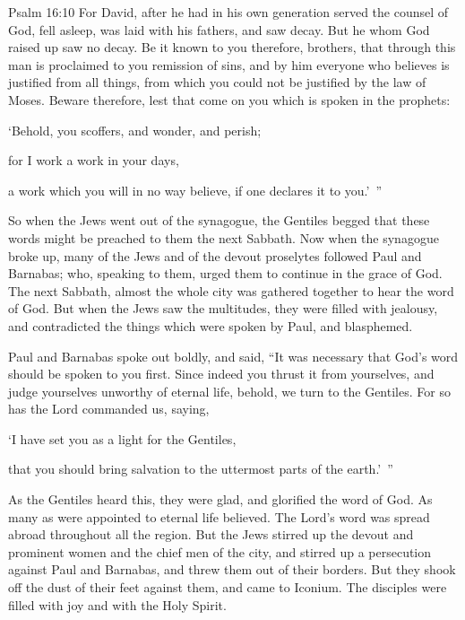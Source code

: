 {{Psalm 16:10}
For David, after he had in his own generation served the counsel of God, fell asleep, was laid with his fathers, and saw decay.
But he whom God raised up saw no decay.
Be it known to you therefore, brothers, that through this man is proclaimed to you remission of sins,
and by him everyone who believes is justified from all things, from which you could not be justified by the law of Moses.
Beware therefore, lest that come on you which is spoken in the prophets:
\par }{\Q {}‘Behold, you scoffers, and wonder, and perish;
\par }{\QB for I work a work in your days,
\par }{\QB a work which you will in no way believe, if one declares it to you.’ ”
\par }{\PP {}So when the Jews went out of the synagogue, the Gentiles begged that these words might be preached to them the next Sabbath.
Now when the synagogue broke up, many of the Jews and of the devout proselytes followed Paul and Barnabas; who, speaking to them, urged them to continue in the grace of God.
The next Sabbath, almost the whole city was gathered together to hear the word of God.
But when the Jews saw the multitudes, they were filled with jealousy, and contradicted the things which were spoken by Paul, and blasphemed.
\par }{\PP {}Paul and Barnabas spoke out boldly, and said, “It was necessary that God’s word should be spoken to you first. Since indeed you thrust it from yourselves, and judge yourselves unworthy of eternal life, behold, we turn to the Gentiles.
For so has the Lord commanded us, saying,
\par }{\Q ‘I have set you as a light for the Gentiles,
\par }{\QB that you should bring salvation to the uttermost parts of the earth.’ ”
\par }{\PP {}As the Gentiles heard this, they were glad, and glorified the word of God. As many as were appointed to eternal life believed.
The Lord’s word was spread abroad throughout all the region.
But the Jews stirred up the devout and prominent women and the chief men of the city, and stirred up a persecution against Paul and Barnabas, and threw them out of their borders.
But they shook off the dust of their feet against them, and came to Iconium.
The disciples were filled with joy and with the Holy Spirit.

}
